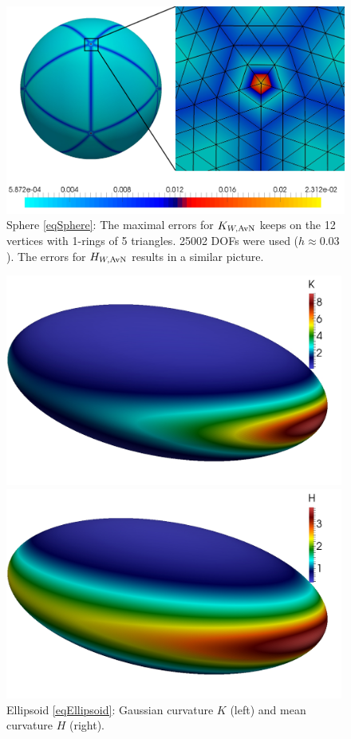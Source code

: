   \begin{figure}
    \centering\includegraphics[width=.49\textwidth]{bilder/sphere/ErrView.jpg}
    \caption{Sphere \eqref{eqSphere}:
                  The maximal errors for \( K_{W,\text{AvN}} \) keeps on the 12 vertices with 1-rings of 5 triangles.
                  25002 DOFs were used (\( h\approx 0.03 \)).
                  The errors for \( H_{W,\text{AvN}} \) results in a similar picture.}
    \label{figSphereErrView}
  \end{figure}

  \begin{figure}
    \begin{minipage}[htp]{.23\textwidth}
      \centering
      \includegraphics[width=0.99\textwidth]{bilder/ellipsoid/K.jpg}
    \end{minipage}\hfill
    \begin{minipage}[htp]{.23\textwidth}
      \centering
      \includegraphics[width=0.99\textwidth]{bilder/ellipsoid/H.jpg}
    \end{minipage}
    \caption{Ellipsoid \eqref{eqEllipsoid}: Gaussian curvature \( K \) (left) and mean curvature \( H \) (right).}
    \label{figEllipsoid}
  \end{figure}

